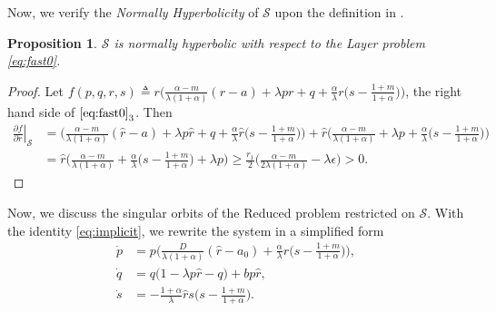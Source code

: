 \documentclass[a4paper,11pt]{article}
\newtheorem{proposition}{Proposition}[section]
\newtheorem{definition}{Definition}[section]
\theoremstyle{remark}
\begin{document}
Now, we verify the {\it Normally Hyperbolicity} of $\mathcal{S}$ upon the definition in \cite[p. 255]{Sz1991}.
\begin{proposition}
$\mathcal{S}$ is normally hyperbolic with respect to the Layer problem \eqref{eq:fast0}.
\end{proposition}
\begin{proof}
 Let $f(p,q,r,s) \triangleq r\Big(\frac{\alpha-m}{\lambda(1+\alpha)}(r-a) + \lambda pr + q +\frac{\alpha}{\lambda}r\big(s- \frac{1+m}{1+\alpha}\big)\Big)$, the right hand side of $\eqref{eq:fast0}_3$. Then
 \begin{align*}
 \left.\frac{\partial f}{\partial r}\right|_{\mathcal{S}} &= \Big(\frac{\alpha-m}{\lambda(1+\alpha)}(\hat{r}-a) + \lambda p\hat{r} + q +\frac{\alpha}{\lambda}\hat{r}\big(s- \frac{1+m}{1+\alpha}\big)\Big) + \hat{r}\Big(\frac{\alpha-m}{\lambda(1+\alpha)} + \lambda p + \frac{\alpha}{\lambda}\big(s- \frac{1+m}{1+\alpha}\big)\Big)\\
 &= \hat{r}\Big(\frac{\alpha-m}{\lambda(1+\alpha)} + \frac{\alpha}{\lambda}\big(s- \frac{1+m}{1+\alpha}\big) + \lambda p\Big)\ge \frac{r_1}{2}\Big(\frac{\alpha-m}{2\lambda(1+\alpha)} - \lambda \epsilon\Big)>0.
 \end{align*}
\end{proof}

Now, we discuss the singular orbits of the Reduced problem restricted on $\mathcal{S}$. With the identity \eqref{eq:implicit}, we rewrite the system in a simplified form
\begin{equation}\label{eq:slow02}
 \begin{aligned}
 \dot{p} &= p\Big(\frac{D}{\lambda(1+\alpha)}(\hat{r}-a_0) + \frac{\alpha}{\lambda}\hat{r}\big(s- \frac{1+m}{1+\alpha}\big) \Big),\\
 \dot{q} &=q\Big(1 -\lambda p \hat{r} -q\Big) + b p \hat{r},\\%
 \dot{s} &= -\frac{1+\alpha}{\lambda}\hat{r}s\big(s- \frac{1+m}{1+\alpha}\big).
 \end{aligned}
\end{equation}
\end{document}

